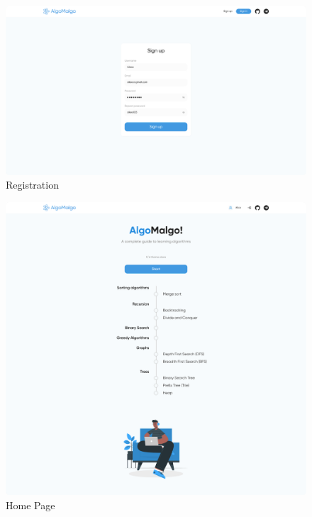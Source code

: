 \pagebreak

\begin{figure}[h]
    \centering
    \includegraphics[scale=0.3]{figures/registration.png}
    \caption{Registration}
    \label{fig:gp}
\end{figure}

\pagebreak

\begin{figure}[h]
    \centering
    \includegraphics[scale=0.3]{figures/homepage.png}
    \caption{Home Page}
    \label{fig:gp}
\end{figure}


\pagebreak

